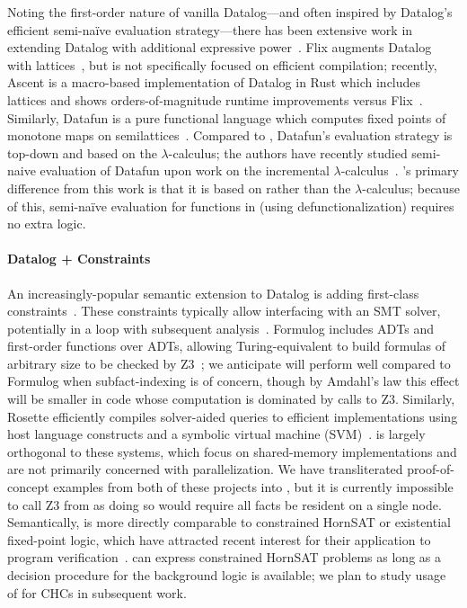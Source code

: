 Noting the first-order nature of vanilla Datalog---and often inspired
by Datalog's efficient semi-na\"ive evaluation strategy---there has
been extensive work in extending Datalog with additional expressive
power~\cite{flix-madsen2016,Madsen:2018,formulog-bembenek2020,Arntzenius:2016,Arntzenius:2019}. Flix
augments Datalog with lattices~\cite{flix-madsen2016,Madsen:2018}, but
is not specifically focused on efficient compilation; recently, Ascent
is a macro-based implementation of Datalog in Rust which includes
lattices and shows orders-of-magnitude runtime improvements versus
Flix~\cite{Sahebolamri:2022}. Similarly, Datafun is a pure functional
language which computes fixed points of monotone maps on
semilattices~\cite{Arntzenius:2016,Arntzenius:2019}. Compared to
\slog{}, Datafun's evaluation strategy is top-down and based on the
$\lambda$-calculus; the authors have recently studied semi-na\:ive
evaluation of Datafun upon work on the incremental
$\lambda$-calculus~\cite{Giarrusso:2019,Yufei:2014}. \slog{}'s primary
difference from this work is that it is based on \core{} rather than
the $\lambda$-calculus; because of this, semi-na\"ive evaluation for
functions in \slog{} (using defunctionalization) requires no extra
logic.

\paragraph*{Datalog + Constraints}

An increasingly-popular semantic extension to Datalog is adding
first-class
constraints~\cite{formulog-bembenek2020,Madsen:2020,Emina:2013,Torlak:2014}. These
constraints typically allow interfacing with an SMT solver,
potentially in a loop with subsequent
analysis~\cite{formulog-bembenek2020}.  Formulog includes ADTs and
first-order functions over ADTs, allowing Turing-equivalent to build
formulas of arbitrary size to be checked by
Z3~\cite{formulog-bembenek2020}; we anticipate \slog{} will perform
well compared to Formulog when subfact-indexing is of concern, though
by Amdahl's law this effect will be smaller in code whose computation
is dominated by calls to Z3. Similarly, Rosette efficiently compiles
solver-aided queries to efficient implementations using host language
constructs and a symbolic virtual machine
(SVM)~\cite{Emina:2013,Torlak:2014}. \slog{} is largely orthogonal to
these systems, which focus on shared-memory implementations and are
not primarily concerned with parallelization. We have transliterated
proof-of-concept examples from both of these projects into \slog{},
but it is currently impossible to call Z3 from \slog{} as doing so
would require all facts be resident on a single node. Semantically,
\slog{} is more directly comparable to constrained HornSAT or
existential fixed-point logic, which have attracted recent interest
for their application to program
verification~\cite{Fedyukovich:2018,Blass1987,Bjorner:2015,Arie:2022}. \core{}
can express constrained HornSAT problems as long as a decision
procedure for the background logic is available; we plan to study
usage of \slog{} for CHCs in subsequent work.

